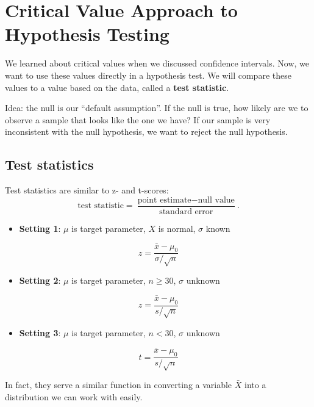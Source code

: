 \documentclass[
]{book}
\providecommand{\tightlist}{%
  \setlength{\itemsep}{0pt}\setlength{\parskip}{0pt}}
\begin{document}
\hypertarget{critical-value-approach-to-hypothesis-testing}{%
\section{Critical Value Approach to Hypothesis Testing}\label{critical-value-approach-to-hypothesis-testing}}

We learned about critical values when we discussed confidence intervals. Now, we want to use these values directly in a hypothesis test. We will compare these values to a value based on the data, called a \textbf{test statistic}.

Idea: the null is our ``default assumption''. If the null is true, how likely are we to observe a sample that looks like the one we have? If our sample is very inconsistent with the null hypothesis, we want to reject the null hypothesis.

\hypertarget{test-statistics}{%
\subsection{Test statistics}\label{test-statistics}}

Test statistics are similar to z- and t-scores: \[\text{test statistic} = \frac{\text{point estimate}-\text{null value}}{\text{standard error}}.\]

\begin{itemize}
\tightlist
\item
  \textbf{Setting 1}: \(\mu\) is target parameter, \(X\) is normal, \(\sigma\) known
\end{itemize}

\[z = \frac{\bar{x}-\mu_0}{\sigma/\sqrt{n}}\]

\begin{itemize}
\tightlist
\item
  \textbf{Setting 2}: \(\mu\) is target parameter, \(n \ge 30\), \(\sigma\) unknown
\end{itemize}

\[z = \frac{\bar{x}-\mu_0}{s/\sqrt{n}}\]

\begin{itemize}
\tightlist
\item
  \textbf{Setting 3}: \(\mu\) is target parameter, \(n < 30\), \(\sigma\) unknown
\end{itemize}

\[t = \frac{\bar{x}-\mu_0}{s/\sqrt{n}}\]

In fact, they serve a similar function in converting a variable \(\bar{X}\) into a distribution we can work with easily.
\end{document}
